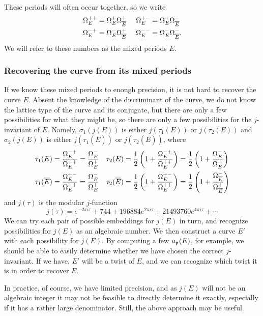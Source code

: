 \documentclass{amsart}
\newcommand{\ap}[1]{a_{\p_{#1}}}
\newcommand{\Ebar}{\overline{E}}
\begin{document}
These periods will often occur together, so we write
\begin{align*}
\Omegapp_E &= \Omegap_E\Omegap_{\Ebar}& \ \Omegapm_E &= \Omegap_E\Omegam_{\Ebar} \\
\Omegamp_E &= \Omegam_E\Omegap_{\Ebar}& \ \Omegamm_E &= \Omegam_E\Omegam_{\Ebar}.
\end{align*}
We will refer to these numbers as the mixed periods $E$.

\subsubsection{Recovering the curve from its mixed periods}
If we know these mixed periods to enough precision, it is not hard
to recover the curve $E$. Absent the knowledge of the discriminant
of the curve, we do not know the lattice type of the curve and its
conjugate, but there are only a few possibilities for what they might
be, so there are only a few possibilities for the $j$-invariant of
$E$. Namely, $\sigma_1(j(E))$ is either $j(\tau_1(E))$ or $j(\tau_2(E))$
and $\sigma_2(j(E))$ is either $j(\tau_1(\Ebar))$ or $j(\tau_2(\Ebar))$,
where
\begin{align*}
    \tau_1(E) &= \frac{\Omegamp_E}{\Omegapp_E} = \frac{\Omegam_E}{\Omegap_E}&  \tau_2(E) &= \frac{1}{2}\left(1 + \frac{\Omegamp_E}{\Omegapp_E}\right) = \frac{1}{2}\left(1 + \frac{\Omegam_E}{\Omegap_E}\right) \\
    \tau_1(\Ebar) &= \frac{\Omegapm_E}{\Omegapp_E} = \frac{\Omegam_E}{\Omegap_E} &    \tau_2(\Ebar) &= \frac{1}{2}\left(1 + \frac{\Omegapm_E}{\Omegapp_E}\right) = \frac{1}{2}\left(1 + \frac{\Omegam_{\Ebar}}{\Omegap_{\Ebar}}\right)
\end{align*}
and $j(\tau)$ is the modular $j$-function
\[
    j(\tau) = e^{-2\pi i \tau} + 744 + 196884e^{2\pi i \tau} + 21493760e^{4\pi i \tau} + \cdots
\]
We can try each pair of possible embeddings for $j(E)$ in turn, and recognize
possibilities for $j(E)$ as an algebraic number. We then construct a curve $E'$
with each possibility for $j(E)$. By computing a few $\ap{}(E)$, for example, we
should be able to easily determine whether we have chosen the correct $j$-invariant.
If we have, $E'$ will be a twist of $E$, and we can recognize which twist it is
in order to recover $E$.

In practice, of course, we have limited precision, and as $j(E)$ will not be
an algebraic integer it may not be feasible to directly determine it exactly,
especially if it has a rather large denominator. Still, the above approach may be useful.
\end{document}
